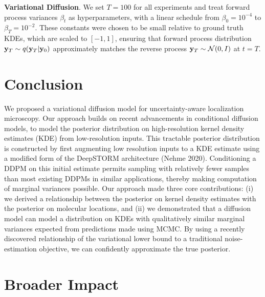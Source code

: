\documentclass{article}
\begin{document}
\textbf{Variational Diffusion}. We set $T = 100$ for all experiments and treat forward process variances $\beta_{t}$ as hyperparameters, with a linear schedule from $\beta_{0}=10^{-4}$ to $\beta_{T}=10^{-2}$.
These constants were chosen to be small relative to ground truth KDEs, which are scaled to $[-1,1]$, ensuring that forward process distribution $\bold{y}_{T}\sim q(\bold{y}_{T}|\bold{y}_{0})$ approximately matches the reverse process $\bold{y}_T\sim \mathcal{N}(0, I)$ at $t=T$.


\section{Conclusion}

We proposed a variational diffusion model for uncertainty-aware localization microscopy. Our approach builds on recent advancements in conditional diffusion models, to model the posterior distribution on high-resolution kernel density estimates (KDE) from low-resolution inputs. This tractable posterior distribution is constructed by first augmenting low resolution inputs to a KDE estimate using a modified form of the DeepSTORM architecture (Nehme 2020). Conditioning a DDPM on this initial estimate permits sampling with relatively fewer samples than most existing DDPMs in similar applications, thereby making computation of marginal variances possible. Our approach made three core contributions: (i) we derived a relationship between the posterior on kernel density estimates with the posterior on molecular locations, and (ii) we demonstrated that a diffusion model can model a distribution on KDEs with qualitatively similar marginal variances expected from predictions made using MCMC. By using a recently discovered relationship of the variational lower bound to a traditional noise-estimation objective, we can confidently approximate the true posterior.

\section{Broader Impact}
\end{document}
